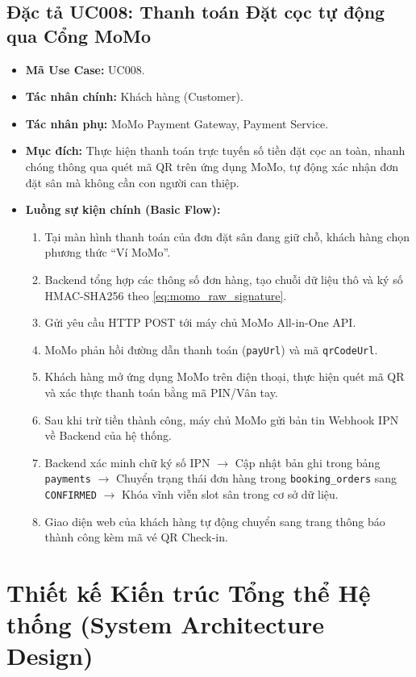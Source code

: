 \subsection{Đặc tả UC008: Thanh toán Đặt cọc tự động qua Cổng MoMo}
\begin{itemize}[leftmargin=1.5cm]
    \item \textbf{Mã Use Case:} UC008.
    \item \textbf{Tác nhân chính:} Khách hàng (Customer).
    \item \textbf{Tác nhân phụ:} MoMo Payment Gateway, Payment Service.
    \item \textbf{Mục đích:} Thực hiện thanh toán trực tuyến số tiền đặt cọc an toàn, nhanh chóng thông qua quét mã QR trên ứng dụng MoMo, tự động xác nhận đơn đặt sân mà không cần con người can thiệp.
    \item \textbf{Luồng sự kiện chính (Basic Flow):}
    \begin{enumerate}
        \item Tại màn hình thanh toán của đơn đặt sân đang giữ chỗ, khách hàng chọn phương thức ``Ví MoMo''.
        \item Backend tổng hợp các thông số đơn hàng, tạo chuỗi dữ liệu thô và ký số HMAC-SHA256 theo \cref{eq:momo_raw_signature}.
        \item Gửi yêu cầu HTTP POST tới máy chủ MoMo All-in-One API.
        \item MoMo phản hồi đường dẫn thanh toán (\texttt{payUrl}) và mã \texttt{qrCodeUrl}.
        \item Khách hàng mở ứng dụng MoMo trên điện thoại, thực hiện quét mã QR và xác thực thanh toán bằng mã PIN/Vân tay.
        \item Sau khi trừ tiền thành công, máy chủ MoMo gửi bản tin Webhook IPN về Backend của hệ thống.
        \item Backend xác minh chữ ký số IPN $\rightarrow$ Cập nhật bản ghi trong bảng \texttt{payments} $\rightarrow$ Chuyển trạng thái đơn hàng trong \texttt{booking\_orders} sang \texttt{CONFIRMED} $\rightarrow$ Khóa vĩnh viễn slot sân trong cơ sở dữ liệu.
        \item Giao diện web của khách hàng tự động chuyển sang trang thông báo thành công kèm mã vé QR Check-in.
    \end{enumerate}
\end{itemize}

\section{Thiết kế Kiến trúc Tổng thể Hệ thống (System Architecture Design)}
\label{sec:kientruc_chitiet}

